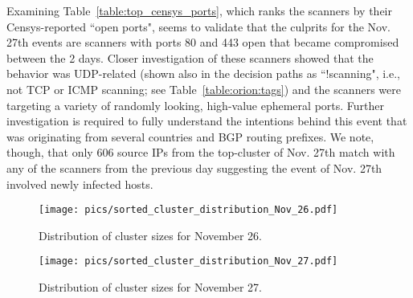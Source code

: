 \documentclass[manuscript, nonacm]{acmart}
\begin{document}
Examining Table~\ref{table:top_censys_ports}, which ranks the scanners
by their Censys-reported ``open ports", seems to validate that the culprits
for the Nov. 27th events are scanners with ports 80 and 443 open that became compromised
between the 2 days. Closer investigation of these scanners showed that the behavior was UDP-related
(shown also in the decision paths as ``!scanning", i.e., not TCP or ICMP scanning; see Table~\ref{table:orion:tags})
and the scanners were targeting a variety of randomly looking, high-value ephemeral ports. 
Further investigation is required to fully understand the intentions behind this event
that was originating from several countries and BGP routing prefixes. We note, though,
that only 606 source IPs from the top-cluster of Nov. 27th match with any of the
scanners from the previous day suggesting the event of Nov. 27th involved newly infected hosts. 



\begin{figure}[t]
    \centering
    \texttt{[image: pics/sorted\_cluster\_distribution\_Nov\_26.pdf]}
    \caption{Distribution of cluster sizes for November 26.}
    \label{fig:scd26}
\end{figure}


\begin{figure}[t]
    \centering
    \texttt{[image: pics/sorted\_cluster\_distribution\_Nov\_27.pdf]}
    \caption{Distribution of cluster sizes for November 27.}
    \label{fig:scd27}
\end{figure}

\end{document}
